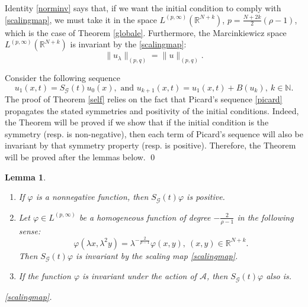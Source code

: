 \documentclass[12pt]{amsart}
\newtheorem{lemma}[theorem]{Lemma}
\newcommand{\R}{\mathbb{R}}
\begin{document}
Identity \eqref{norminv} says that, if we want the initial condition to comply with \eqref{scalingmap}, we must take it in the space $L^{(p,\infty)}(\R^{N+k})$, $p=\frac{N+2k}{2}(\rho-1)$, which is the case of Theorem \ref{globale}. Furthermore, the Marcinkiewicz space $L^{(p,\infty)}(\R^{N+k})$ is invariant by the \eqref{scalingmap}:
$$\|u_\lambda\|_{(p,q)} = \|u\|_{(p,q)} .$$

Consider the following sequence
\begin{equation}\label{picard}
	u_1(x,t)=S_\mathcal{G}(t)u_0(x), \text{ and } u_{k+1}(x,t)=u_1(x,t)+B(u_k), \ k\in\mathbb{N}.
\end{equation}
The proof of Theorem \ref{self} relies on the fact that Picard's sequence \ref{picard} propagates the stated symmetries and positivity of the initial conditions. Indeed, the Theorem will be proved if we show that if the initial condition is the symmetry (resp. is non-negative), then each term of Picard's sequence will also be invariant by that symmetry property (resp. is positive). Therefore, the Theorem will be proved after the lemmas below.
\qed


\begin{lemma}\label{scalor}
	\begin{enumerate}
		\item[(a)] If $\varphi$ is a nonnegative function, then $S_\mathcal{G}(t)\varphi$ is positive.
		\item[(b)] Let $\varphi \in L^{(p, \infty)}$ be a homogeneous function of degree $-\frac{2}{\rho-1}$ in the following sense:
		\begin{equation}\label{homog}
			\varphi(\lambda x, \lambda^2 y) = \lambda^{-\frac{2}{\rho-1}} \varphi(x,y),  \ (x,y)\in\R^{N+k} .
		\end{equation}
		Then $S_\mathcal{G}(t)\varphi$ is invariant by the scaling map \eqref{scalingmap}.
		\item[(c)] If the function $\varphi$ is invariant under the action of $\mathcal{A}$, then $S_\mathcal{G}(t)\varphi$ also is.
	\end{enumerate}
	\eqref{scalingmap}.
\end{lemma}
\end{document}
